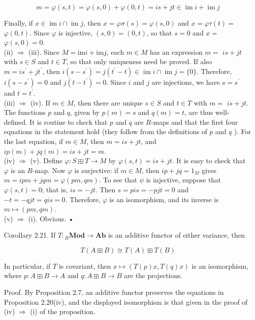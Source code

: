 \documentclass[10pt]{article}
\begin{document}
$$
m=\varphi(s, t)=\varphi(s, 0)+\varphi(0, t)=i s+j t \in \operatorname{im} i+\operatorname{im} j
$$

Finally, if $x \in \operatorname{im} i \cap \operatorname{im} j$, then $x=\varphi \sigma(s)=\varphi(s, 0)$ and $x=\varphi \tau(t)=$ $\varphi(0, t)$. Since $\varphi$ is injective, $(s, 0)=(0, t)$, so that $s=0$ and $x=$ $\varphi(s, 0)=0$.\\
(ii) $\Rightarrow$ (iii). Since $M=\mathrm{im} i+\mathrm{im} j$, each $m \in M$ has an expression $m=$ $i s+j t$ with $s \in S$ and $t \in T$, so that only uniqueness need be proved. If also $m=i s^{\prime}+j t^{\prime}$, then $i\left(s-s^{\prime}\right)=j\left(t^{\prime}-t\right) \in \operatorname{im} i \cap \operatorname{im} j=\{0\}$. Therefore, $i\left(s-s^{\prime}\right)=0$ and $j\left(t-t^{\prime}\right)=0$. Since $i$ and $j$ are injections, we have $s=s^{\prime}$ and $t=t^{\prime}$.\\
(iii) $\Rightarrow$ (iv). If $m \in M$, then there are unique $s \in S$ and $t \in T$ with $m=$ $i s+j t$. The functions $p$ and $q$, given by $p(m)=s$ and $q(m)=t$, are thus well-defined. It is routine to check that $p$ and $q$ are $R$-maps and that the first four equations in the statement hold (they follow from the definitions of $p$ and $q$ ). For the last equation, if $m \in M$, then $m=i s+j t$, and $i p(m)+j q(m)=i s+j t=m$.\\
(iv) $\Rightarrow$ (v). Define $\varphi: S \boxplus T \rightarrow M$ by $\varphi(s, t)=i s+j t$. It is easy to check that $\varphi$ is an $R$-map. Now $\varphi$ is surjective: if $m \in M$, then $i p+j q=1_{M}$ gives $m=i p m+j q m=\varphi(p m, q m)$. To see that $\psi$ is injective, suppose that $\varphi(s, t)=0$; that is, $i s=-j t$. Then $s=p i s=-p j t=0$ and $-t=-q j t=q i s=0$. Therefore, $\varphi$ is an isomorphism, and its inverse is $m \mapsto(p m, q m)$.\\
(v) $\Rightarrow$ (i). Obvious. •

Corollary 2.21. If $T:{ }_{R} \mathbf{M o d} \rightarrow \mathbf{A b}$ is an additive functor of either variance, then

$$
T(A \boxplus B) \cong T(A) \boxplus T(B)
$$

In particular, if $T$ is covariant, then $x \mapsto(T(p) x, T(q) x)$ is an isomorphism, where $p: A \boxplus B \rightarrow A$ and $q: A \boxplus B \rightarrow B$ are the projections.

Proof. By Proposition 2.7, an additive functor preserves the equations in Proposition 2.20(iv), and the displayed isomorphism is that given in the proof of (iv) $\Rightarrow$ (i) of the proposition.
\end{document}
